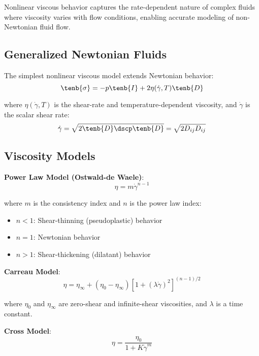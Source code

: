 \begin{keypoint}
Nonlinear viscous behavior captures the rate-dependent nature of complex fluids where viscosity varies with flow conditions, enabling accurate modeling of non-Newtonian fluid flow.
\end{keypoint}

\subsection{Generalized Newtonian Fluids}

The simplest nonlinear viscous model extends Newtonian behavior:
\begin{equation}
\tenb{\sigma} = -p\tenb{I} + 2\eta(\dot{\gamma}, T) \tenb{D}
\end{equation}

where $\eta(\dot{\gamma}, T)$ is the shear-rate and temperature-dependent viscosity, and $\dot{\gamma}$ is the scalar shear rate:
\begin{equation}
\dot{\gamma} = \sqrt{2\tenb{D}\dscp\tenb{D}} = \sqrt{2D_{ij}D_{ij}}
\end{equation}

\subsection{Viscosity Models}

\textbf{Power Law Model (Ostwald-de Waele)}:
\begin{equation}
\eta = m\dot{\gamma}^{n-1}
\end{equation}

where $m$ is the consistency index and $n$ is the power law index:
\begin{itemize}
\item $n < 1$: Shear-thinning (pseudoplastic) behavior
\item $n = 1$: Newtonian behavior
\item $n > 1$: Shear-thickening (dilatant) behavior
\end{itemize}

\textbf{Carreau Model}:
\begin{equation}
\eta = \eta_\infty + (\eta_0 - \eta_\infty)[1 + (\lambda\dot{\gamma})^2]^{(n-1)/2}
\end{equation}

where $\eta_0$ and $\eta_\infty$ are zero-shear and infinite-shear viscosities, and $\lambda$ is a time constant.

\textbf{Cross Model}:
\begin{equation}
\eta = \frac{\eta_0}{1 + K\dot{\gamma}^m}
\end{equation}

